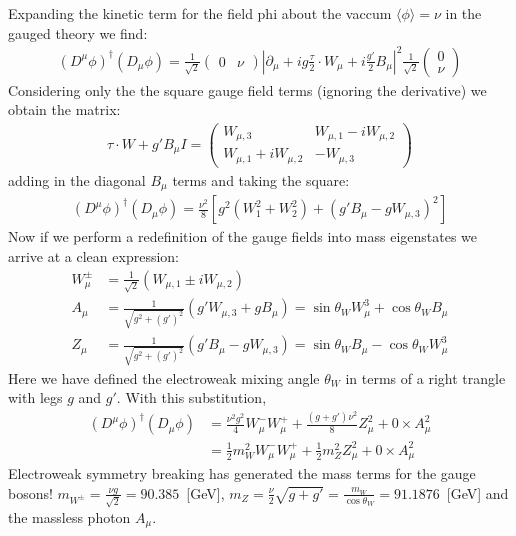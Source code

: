 Expanding the kinetic term for the field phi about the vaccum $\langle \phi \rangle = \nu$ in the gauged theory we find:
\begin{align*}
(D^\mu \phi)^\dagger (D_\mu \phi) = \frac{1}{\sqrt{2}} \left (\begin{array}{cc} 0  & \nu \end{array} \right )  \left | \partial_\mu + i g \frac{\tau}{2} \cdot W_\mu + i \frac{g'}{2} B_\mu \right|^2  \frac{1}{\sqrt{2}} \left (\begin{array}{c} 0 \\ \nu \end{array} \right ) 
\end{align*}
Considering only the the square gauge field terms (ignoring the derivative)  we obtain the matrix:
\begin{align*}
\tau \cdot W + g'B_\mu I = \left (\begin{array}{cc} W_{\mu,3} & W_{\mu,1} - i W_{\mu,2}  \\ W_{\mu,1}+ i W_{\mu,2} & - W_{\mu,3} \end{array} \right )
\end{align*}
adding in the diagonal $B_\mu$ terms and taking the square:
\begin{align*}
(D^\mu \phi)^\dagger (D_\mu \phi) = \frac{\nu^2}{8} \left [g^2 (W_1^2 + W_2^2) + (g' B_\mu - g W_{\mu,3})^2 \right]
\end{align*}
Now if we perform a redefinition of the gauge fields into mass eigenstates we arrive at a clean expression:
\begin{align*}
W_{\mu}^{\pm} &= \frac{1}{\sqrt{2}}( W_{\mu,1}  \pm i W_{\mu,2} )  \\
A_{\mu} &= \frac{1}{\sqrt{g^2 + (g')^2}} (g' W_{\mu,3} + g B_\mu) = \sin \theta_W W^3_\mu + \cos \theta_W B_\mu \\
Z_{\mu} &= \frac{1}{\sqrt{g^2 + (g')^2}}( g' B_\mu - g W_{\mu,3}) = \sin \theta_W B_\mu - \cos \theta_W W_\mu^3 
\end{align*}
Here we have defined the electroweak mixing angle $\theta_W$ in terms of a right trangle with legs $g$ and $g'$. With this substitution,
\begin{align*}
(D^\mu \phi)^\dagger (D_\mu \phi) &= \frac{\nu^2 g^2}{4} W_{\mu}^{-} W_{\mu}^{+} + \frac{(g+g')\nu^2}{8} Z_\mu^2  + 0 \times A_\mu^2 \\ 
&= \frac{1}{2} m_{W}^2 W_\mu^- W_\mu^+ + \frac{1}{2} m_Z^2 Z_\mu^2  + 0 \times A_\mu^2
\end{align*}
Electroweak symmetry breaking has generated the mass terms for the gauge bosons! 
$m_{W^{\pm}} = \frac{\nu g}{\sqrt{2}} = 90.385$~[GeV],
 $m_Z = \frac{\nu}{2}\sqrt{g+g'} = \frac{m_W}{\cos \theta_W} = 91.1876$~[GeV]  and the massless photon $A_\mu$. 


